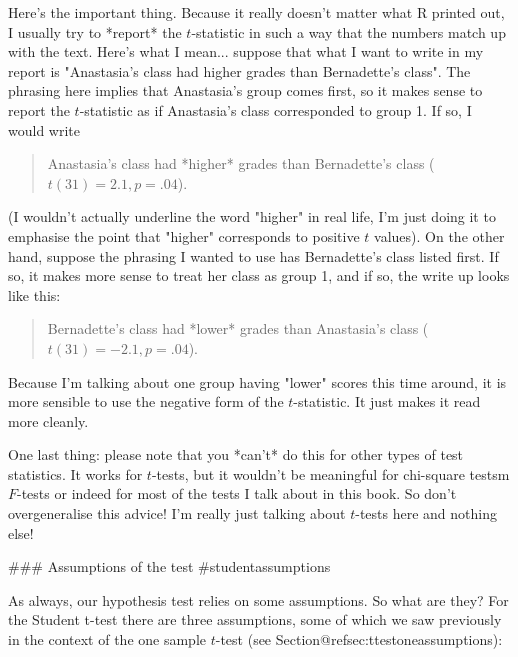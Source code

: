 Here's the important thing. Because it really doesn't matter what R printed out, I usually try to *report* the $t$-statistic in such a way that the numbers match up with the text. Here's what I mean... suppose that what I want to write in my report is "Anastasia's class had higher  grades than Bernadette's class". The phrasing here implies that Anastasia's group comes first, so it makes sense to report the $t$-statistic as if Anastasia's class corresponded to group 1. If so, I would write 
\begin{quote}
Anastasia's class had *higher* grades than Bernadette's class ($t(31)= 2.1, p=.04$). 
\end{quote}
(I wouldn't actually underline the word "higher" in real life, I'm just doing it to emphasise the point that "higher" corresponds to positive $t$ values). On the other hand, suppose the phrasing I wanted to use has Bernadette's class listed first. If so, it makes more sense to treat her class as group 1, and if so, the write up looks like this:
\begin{quote}
Bernadette's class had *lower* grades than Anastasia's class ($t(31)= -2.1, p=.04$). 
\end{quote}
Because I'm talking about one group having "lower" scores this time around, it is more sensible to use the negative form of the $t$-statistic. It just makes it read more cleanly.

One last thing: please note that you *can't* do this for other types of test statistics. It works for $t$-tests, but it wouldn't be meaningful for  chi-square testsm $F$-tests or indeed for most of the tests I talk about in this book. So don't overgeneralise this advice! I'm really just talking about $t$-tests here and nothing else!
 
 
### Assumptions of the test {#studentassumptions}

As always, our hypothesis test relies on some assumptions. So what are they? For the Student t-test there are three assumptions, some of which we saw previously in the context of the one sample $t$-test (see Section@refsec:ttestoneassumptions):


